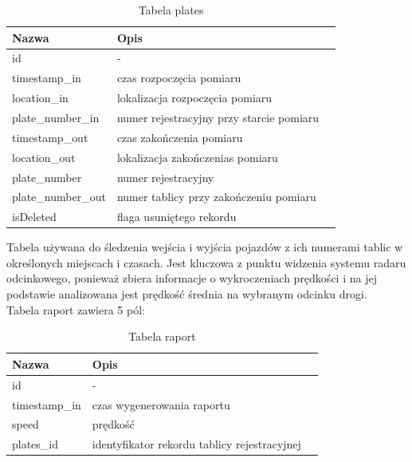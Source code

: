\documentclass[12pt,a4paper,oneside]{article}
\theoremstyle{definition}
\numberwithin{equation}{section}
\begin{document}
    \begin{table}[h]
    \centering
    \begin{tabularx}{\textwidth}{|X|X|X|}
    \hline
    \textbf{Nazwa} & \textbf{Opis} \\ \hline
    id &  -   \\ \hline
    timestamp{\_}in & czas rozpoczęcia pomiaru \\  \hline
    location{\_}in & lokalizacja rozpoczęcia pomiaru \\  \hline
    plate{\_}number{\_}in & numer rejestracyjny przy starcie pomiaru \\  \hline
    timestamp{\_}out & czas zakończenia pomiaru \\  \hline
    location{\_}out & lokalizacja zakończenias pomiaru \\ \hline
    plate{\_}number & numer rejestracyjny \\ \hline
    plate{\_}number{\_}out & numer tablicy przy zakończeniu pomiaru \\ \hline
    isDeleted & flaga usuniętego rekordu \\ \hline
    \end{tabularx}
    \caption{Tabela plates}
    \end{table}
        
        Tabela używana do śledzenia wejścia i wyjścia pojazdów z ich numerami tablic w określonych miejscach i czasach. Jest kluczowa z punktu widzenia systemu radaru odcinkowego, ponieważ zbiera informacje o wykroczeniach prędkości i na jej podstawie analizowana jest prędkość średnia na wybranym odcinku drogi.\\


    Tabela raport zawiera 5 pól: 

    \begin{table}[h]
    \centering
    \begin{tabularx}{\textwidth}{|X|X|X|}
    \hline
    \textbf{Nazwa} & \textbf{Opis} \\ \hline
    id &  -   \\ \hline
    timestamp{\_}in & czas wygenerowania raportu \\  \hline
    speed & prędkość \\  \hline
    plates{\_}id & identyfikator rekordu tablicy rejestracyjnej \\  \hline
    \end{tabularx}
    \caption{Tabela raport}
    \end{table}
            
\end{document}
